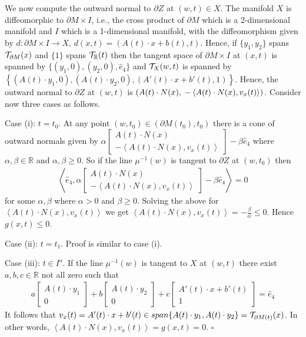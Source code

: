 \documentclass{elsart5p}
\begin{document}
We now compute the outward normal to $\partial Z$ at $(w,t) \in X$.
The manifold $X$ is diffeomorphic to $\partial M \times I$, i.e., the cross product of $\partial M$ 
which is a 2-dimensional manifold and $I$ which is a 1-dimensional manifold, with the 
diffeomorphism given by $d: \partial M \times I \to X$, $d(x,t) = (A(t) \cdot x+b(t), t)$.  
Hence, if $\{y_1, y_2 \}$ spans ${\cal T}_{\partial M}(x)$  and $\{1\}$ spans ${\cal T}_{\mathbb{R}}(t)$ 
then the tangent space of $\partial M \times I$ at $(x,t)$ is spanned by 
$\{(y_1, 0), (y_2, 0), \hat{e}_4 \}$ and ${\cal T}_{X}(w,t)$ is spanned by \\
 $\left \{ (A(t) \cdot y_1 , 0),  (A(t) \cdot y_2 , 0),  (A'(t)  \cdot x + b'(t),  1) \right \}$.
Hence, the outward normal to $\partial Z$ at $(w,t)$ is 
$( A(t) \cdot N(x) , \\ - \left < A(t) \cdot N(x) ,v_x(t)  \right >)$.
Consider now three cases as follows.

Case (i): $t=t_0$.  At any point $(w,t_0) \in (\partial M(t_0), t_0)$ there is a cone of outward normals 
given by $\alpha \begin{bmatrix} A(t) \cdot N(x) \\ - \left < A(t) \cdot N(x) , v_x(t)  \right > \end{bmatrix} - \beta \hat{e}_4$ 
where $\alpha, \beta \in \mathbb{R}$ and $\alpha, \beta \geq 0$.  So if the line $\mu^{-1}(w)$ is tangent to $\partial Z$ at $(w,t_0)$ then 
\begin{align*}
\left <  \hat{e}_4,  \alpha \begin{bmatrix} A(t) \cdot N(x) \\ - \left < A(t) \cdot N(x) ,v_x(t)  \right > \end{bmatrix} - \beta \hat{e}_4 \right > = 0
\end{align*}
for some $\alpha, \beta$ where $\alpha > 0$ and $\beta \geq 0$.  Solving the above for $ \left < A(t) \cdot N(x) ,v_x(t)  \right >$ we get $ \left < A(t) \cdot N(x) ,v_x(t)  \right > = - \frac{\beta}{\alpha} \leq 0$.
Hence $g(x,t) \leq 0$.

Case (ii): $t = t_1$.  Proof is similar to case (i).

Case (iii): $t \in I^o$. If the line $\mu^{-1}(w)$ is 
tangent to $X$ at $(w,t)$ there exist $a,b,c \in \mathbb{R}$ not all zero such that 
\begin{align*}
a \begin{bmatrix} A(t) \cdot y_1 \\ 0 \end{bmatrix} + b \begin{bmatrix} A(t) \cdot y_2  \\ 0 \end{bmatrix} + c \begin{bmatrix} A'(t) \cdot x + b'(t) \\ 1 \end{bmatrix} = \hat{e}_4
\end{align*}
It follows that $v_x(t) = A'(t) \cdot x + b'(t) \in span\{ A(t) \cdot y_1,  A(t) \cdot y_2 \} = {\cal T}_{\partial M(t)}(x)$.  
In other words, $\left < A(t) \cdot N(x), v_x(t) \right > = g(x, t) = 0$.
\hfill $\square$
\end{document}
